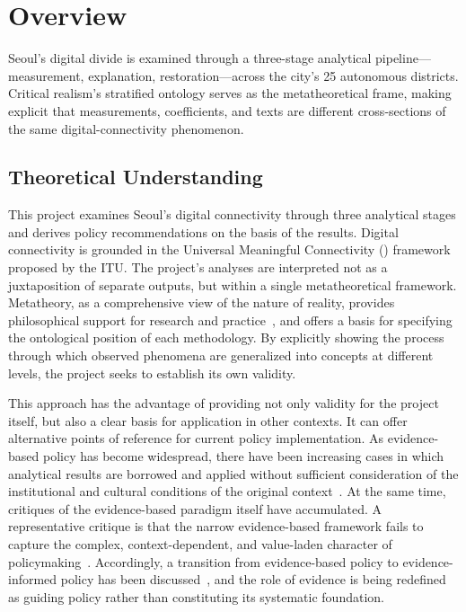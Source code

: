 \section{Overview}
\label{sec:overview}


\begin{quoteblock}
Seoul's digital divide is examined through a three-stage analytical pipeline---measurement, explanation, restoration---across the city's 25 autonomous districts. Critical realism's stratified ontology serves as the metatheoretical frame, making explicit that measurements, coefficients, and texts are different cross-sections of the same digital-connectivity phenomenon.
\end{quoteblock}

\subsection{Theoretical Understanding}
\label{subsec:1-1}

This project examines Seoul's digital connectivity through three analytical stages and derives policy recommendations on the basis of the results. Digital connectivity is grounded in the Universal Meaningful Connectivity (\umc{}) framework proposed by the ITU. The project's analyses are interpreted not as a juxtaposition of separate outputs, but within a single metatheoretical framework. Metatheory, as a comprehensive view of the nature of reality, provides philosophical support for research and practice~\citep{AllanaClark2018}, and offers a basis for specifying the ontological position of each methodology. By explicitly showing the process through which observed phenomena are generalized into concepts at different levels, the project seeks to establish its own validity.

This approach has the advantage of providing not only validity for the project itself, but also a clear basis for application in other contexts. It can offer alternative points of reference for current policy implementation. As evidence-based policy has become widespread, there have been increasing cases in which analytical results are borrowed and applied without sufficient consideration of the institutional and cultural conditions of the original context~\citep{DolowitzMarsh2000}. At the same time, critiques of the evidence-based paradigm itself have accumulated. A representative critique is that the narrow evidence-based framework fails to capture the complex, context-dependent, and value-laden character of policymaking~\citep{GreenhalghRussell2009}. Accordingly, a transition from evidence-based policy to evidence-informed policy has been discussed~\citep{Head2010}, and the role of evidence is being redefined as guiding policy rather than constituting its systematic foundation.

